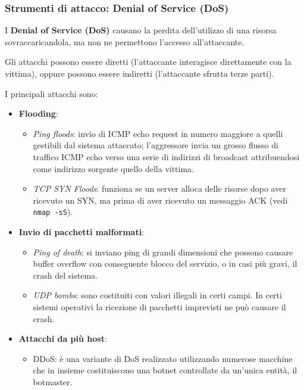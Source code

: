         \subsubsection{Strumenti di attacco: Denial of Service (DoS)}
            I \textbf{Denial of Service (DoS)} causano la perdita dell'utilizzo di una risorsa sovraccaricandola, ma non ne permettono l'accesso all'attaccante.
        
            Gli attacchi possono essere diretti (l'attaccante interagisce direttamente con la vittima), oppure possono essere indiretti (l'attaccante sfrutta terze parti).
        
            I principali attacchi sono:
            \begin{itemize}
                \item \textbf{Flooding}:
                \begin{itemize}
                    \item \textit{Ping floods}: invio di ICMP echo request in numero maggiore a quelli gestibili dal sistema attaccato; l'aggressore invia un grosso flusso di traffico ICMP echo verso una serie di indirizzi di broadcast attribuendosi come indirizzo sorgente quello della vittima.
                    \item \textit{TCP SYN Floods}: funziona se un server alloca delle risorse dopo aver ricevuto un SYN, ma prima di aver ricevuto un messaggio ACK (vedi \verb|nmap -sS|).
                \end{itemize}
                \item \textbf{Invio di pacchetti malformati}:
                \begin{itemize}
                    \item \textit{Ping of death}: si inviano ping di grandi dimensioni che possono causare buffer overflow con conseguente blocco del servizio, o in casi più gravi, il crash del sistema.
                    \item \textit{UDP bombs}: sono costituiti con valori illegali in certi campi. In certi sistemi operativi la ricezione di pacchetti imprevisti ne può causare il crash.
                \end{itemize}
                \item \textbf{Attacchi da più host}:
                \begin{itemize}
                    \item DDoS: è una variante di DoS realizzato utilizzando numerose macchine che in insieme costituiscono una botnet controllate da un'unica entità, il botmaster.
                \end{itemize}
            \end{itemize}

